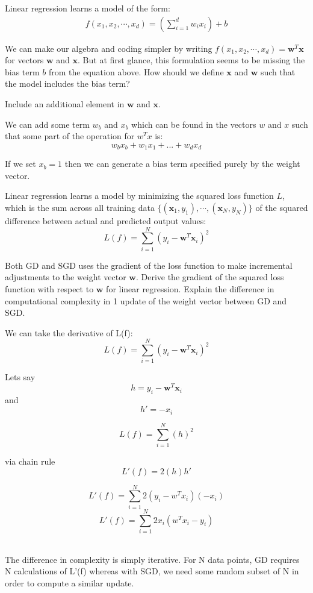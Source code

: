 Linear regression learns a model of the form:
\begin{align*}
  f(x_1, x_2, \cdots, x_d) = \left(\sum_{i=1}^d w_i x_i\right) + b
\end{align*}

\begin{problem}[1]
  We can make our algebra and coding simpler by writing $f(x_1, x_2, \cdots, x_d) = \mathbf{w}^T\mathbf{x}$ for vectors $\mathbf{w}$ and $\mathbf{x}$.  But at first glance, this formulation seems to be missing the bias term $b$ from the equation above.  How should we define $\mathbf{x}$ and $\mathbf{w}$ such that the model includes the bias term?
\end{problem}
\begin{hint}
  Include an additional element in $\mathbf{w}$ and $\mathbf{x}$.
\end{hint}
\begin{solution}
  We can add some term $w_b$ and $x_b$ which can be found in the vectors $w$ and $x$ such that some part of the operation for $w^Tx$ is:
  $$w_b x_b + w_1 x_1 + ... + w_d x_d$$

  If we set $x_b = 1$ then we can generate a bias term specified purely by the weight vector.
\end{solution}

Linear regression learns a model by minimizing the squared loss function $L$, which is the sum across all training data $\{(\mathbf{x}_1, y_1),\cdots,(\mathbf{x}_N, y_N)\}$ of the squared difference between actual and predicted output values:
\[L(f) = \sum_{i=1}^N (y_i - \mathbf{w}^T\mathbf{x}_i)^2\]

\begin{problem}[2]
  Both GD and SGD uses the gradient of the loss function to make incremental adjustments to the weight vector $\mathbf{w}$. Derive the gradient of the squared loss function with respect to $\mathbf{w}$ for linear regression. Explain the difference in computational complexity in 1 update of the weight vector between GD and SGD. 
\end{problem}
\begin{solution}
  We can take the derivative of L(f):
    $$L(f) = \sum_{i=1}^N (y_i - \mathbf{w}^T\mathbf{x}_i)^2$$

    Lets say 
    $$h = y_i - \mathbf{w}^T\mathbf{x}_i$$
    and
    $$h' = -x_i$$

    $$L(f) = \sum_{i=1}^N (h)^2$$

    via chain rule
    $$L' (f) = 2(h) h'$$
    
    $$L' (f)=\sum^{N}_{i=1} 2(y_i-w^Tx_i)(- x_i) $$
    $$L' (f)=\sum^{N}_{i=1} 2x_i(w^Tx_i-y_i)$$

    \\

    The difference in complexity is simply iterative. For N data points, GD requires N calculations of L'(f) whereas with SGD, we need some random subset of N in order to compute a similar update.
\end{solution}


